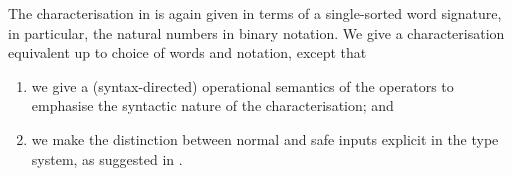 The characterisation in \cite{bellantoni-cook-1992} is again given in terms of
a single-sorted word signature, in particular, the natural numbers in binary
notation. We give a characterisation equivalent up to choice of words and
notation, except that

\begin{enumerate}[label=(\arabic*)]

\item we give a (syntax-directed) operational semantics of the operators to
emphasise the syntactic nature of the characterisation; and

\item we make the distinction between normal and safe inputs explicit in the
type system, as suggested in \cite[\textsection\ 5]{bellantoni-cook-1992}.

\end{enumerate}

